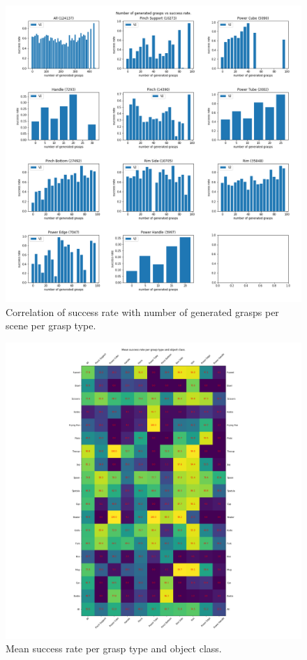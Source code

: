 \begin{figure}
\centering
\includegraphics[width=0.8\columnwidth]{images/post-analysis/number_of_generated_grasps_vs_success_rate.png}
\caption{Correlation of success rate with number of generated grasps per scene per grasp type.}
\label{fig:post10}
\end{figure}

\begin{figure}
\centering
\includegraphics[width=0.8\columnwidth]{images/post-analysis/mean_success_rate_per_grasp_type_and_object_class.png}
\caption{Mean success rate per grasp type and object class.}
\label{fig:post12}
\end{figure}

